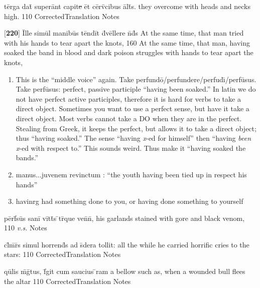 \latline
  {t\=erg\-a d\-at\={\macron {\i}} s\-up\-er\=ant c\-ap\-it\sout{e }\=et c\=erv\={\macron {\i}}c\-ib\-us \=alt\={\macron {\i}}s.}
  { they overcome with heads and necks high. }
  {110}
  { CorrectedTranslation }
  { Notes }


\latline
  {[\textbf{220}] \=Ill\-e s\-im\=ul m\-an\-ib\=us t\=end\=it d\={\macron {\i}}v\=ell\-er\-e n\={}d\={}s}
  { At the same time, that man tried with his hands to tear apart the knots, }
  {160}
  { At the same time, that man, having soaked the band in blood and dark poison struggles with hands to tear apart the knots, }
  { \begin{enumerate}
  	\item This is the ``middle voice'' again. Take perfund\={o}/perfundere/perfud\={\i}/perf\={u}sus. Take perf\={u}sus: perfect,
    passive participle ``having been soaked.'' In latin we do not have perfect active participles, therefore it is hard for verbs
    to take a direct object. Sometimes you want to use a perfect sense, but have it take a direct object. Most verbs cannot take a
    DO when they are in the perfect. Stealing from Greek, it keeps the perfect, but allows it to take a direct object; thus
    ``having soaked.'' The sense ``having \emph{x}-ed for himself'' then ``having \emph{been }\emph{x}-ed with respect to.'' This
    sounds weird. Thus make it ``having soaked the bands.''
		\item manus...juvenem revinctum :  ``the youth having been tied up in respect his hands''
		\item havinrg had something done to you, or having done something to yourself
  \end{enumerate} }


\latline
  {p\=erf\={}s\=us s\-an\-i\={} v\=itt\={}s \={}tr\={}qu\-e v\-en\={}n\={},}
  { his garlands stained with gore and black venom, }
  {110}
  { \emph{v.s.} }
  { Notes }


\latline
  {cl\={}m\={}r\={}s simul horrend\={}s ad s\={\macron {\i}}dera tollit:}
  { all the while he carried horrific cries to the stars: }
  {110}
  { CorrectedTranslation }
  { Notes }


\latline
  {qu\={}lis m\={}g\={\macron {\i}}tus, f\={}git cum saucius \={}ram}
  { a bellow such as, when a wounded bull flees the altar }
  {110}
  { CorrectedTranslation }
  { Notes }


